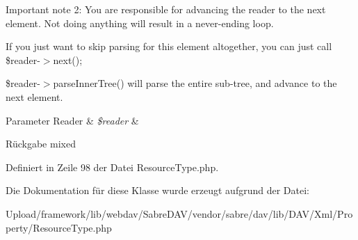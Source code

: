 Important note 2\+: You are responsible for advancing the reader to the next element. Not doing anything will result in a never-\/ending loop.

If you just want to skip parsing for this element altogether, you can just call \$reader-\/$>$next();

\$reader-\/$>$parse\+Inner\+Tree() will parse the entire sub-\/tree, and advance to the next element.


\begin{DoxyParams}[1]{Parameter}
Reader & {\em \$reader} & \\
\hline
\end{DoxyParams}
\begin{DoxyReturn}{Rückgabe}
mixed 
\end{DoxyReturn}


Definiert in Zeile 98 der Datei Resource\+Type.\+php.



Die Dokumentation für diese Klasse wurde erzeugt aufgrund der Datei\+:\begin{DoxyCompactItemize}
\item 
Upload/framework/lib/webdav/\+Sabre\+D\+A\+V/vendor/sabre/dav/lib/\+D\+A\+V/\+Xml/\+Property/Resource\+Type.\+php\end{DoxyCompactItemize}
